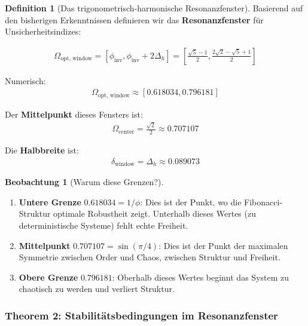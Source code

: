 \documentclass[a4paper, 12pt, twoside, openright]{report}
\theoremstyle{definition}
\newtheorem{definition}[theorem]{Definition}
\newtheorem{beobachtung}{Beobachtung}
\theoremstyle{definition}
\begin{document}
\begin{definition}[Das trigonometrisch-harmonische Resonanzfenster]

Basierend auf den bisherigen Erkenntnissen definieren wir das \textbf{Resonanzfenster} für Unsicherheitsindizes:

\begin{align}
\Omega_{\text{opt, window}} = \left[\phi_{\text{inv}}, \phi_{\text{inv}} + 2\Delta_h\right] = \left[\frac{\sqrt{5}-1}{2}, \frac{2\sqrt{2}-\sqrt{5}+1}{2}\right]
\end{align}

Numerisch:
\begin{align}
\Omega_{\text{opt, window}} \approx [0.618034, 0.796181]
\end{align}

Der \textbf{Mittelpunkt} dieses Fensters ist:
\begin{align}
\Omega_{\text{center}} = \frac{\sqrt{2}}{2} \approx 0.707107
\end{align}

Die \textbf{Halbbreite} ist:
\begin{align}
\delta_{\text{window}} = \Delta_h \approx 0.089073
\end{align}

\end{definition}

\begin{beobachtung}[Warum diese Grenzen?]
\begin{enumerate}
	\item \textbf{Untere Grenze} $0.618034 = 1/\phi$: Dies ist der Punkt, wo die Fibonacci-Struktur optimale Robustheit zeigt. Unterhalb dieses Wertes (zu deterministische Systeme) fehlt echte Freiheit.
	
	\item \textbf{Mittelpunkt} $0.707107 = \sin(\pi/4)$: Dies ist der Punkt der maximalen Symmetrie zwischen Order und Chaos, zwischen Struktur und Freiheit.
	
	\item \textbf{Obere Grenze} $0.796181$: Oberhalb dieses Wertes beginnt das System zu chaotisch zu werden und verliert Struktur.
\end{enumerate}
\end{beobachtung}

\subsubsection*{Theorem 2: Stabilitätsbedingungen im Resonanzfenster}
\end{document}
